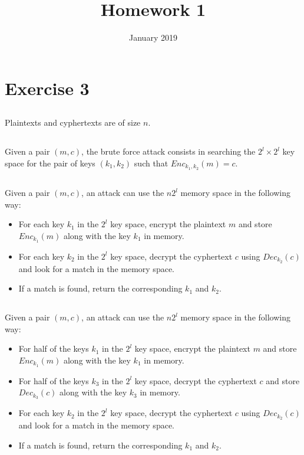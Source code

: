 \documentclass{article}
\title{Homework 1}
\author{}
\date{January 2019}
\begin{document}
\maketitle


\section{Exercise 3}

\subsection{}
Plaintexts and cyphertexts are of size $n$. 

\subsection{}
Given a pair $(m, c)$, the brute force attack consists in searching the $2^{l}\times 2^{l}$ key space for the pair of keys $(k_{1}, k_{2})$ such that $Enc_{k_{1}, k_{2}}(m) = c$.

\subsection{}
Given a pair $(m, c)$, an attack can use the $n 2^{l}$ memory space in the following way:
\begin{itemize}
\item For each key $k_{1}$ in the $2^{l}$ key space, encrypt the plaintext $m$ and store $Enc_{k_{1}}(m)$ along with the key $k_{1}$ in memory.  
\item For each key $k_{2}$ in the $2^{l}$ key space, decrypt the cyphertext $c$ using $Dec_{k_{2}}(c)$ and look for a match in the memory space.
\item If a match is found, return the corresponding $k_{1}$ and $k_{2}$. 
\end{itemize} 

\subsection{}
Given a pair $(m, c)$, an attack can use the $n 2^{l}$ memory space in the following way:
\begin{itemize}
\item For half of the keys $k_{1}$ in the $2^{l}$ key space, encrypt the plaintext $m$ and store $Enc_{k_{1}}(m)$ along with the key $k_{1}$ in memory.  
\item For half of the keys $k_{3}$ in the $2^{l}$ key space, decrypt the cyphertext $c$ and store $Dec_{k_{3}}(c)$ along with the key $k_{3}$ in memory. 

\item For each key $k_{2}$ in the $2^{l}$ key space, decrypt the cyphertext $c$ using $Dec_{k_{2}}(c)$ and look for a match in the memory space.
\item If a match is found, return the corresponding $k_{1}$ and $k_{2}$. 
\end{itemize}
\end{document}
